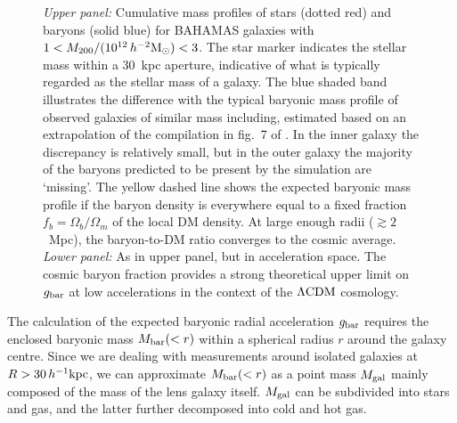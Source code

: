 \documentclass[usenatbib]{mnras}
\newcommand{\hmsun}{\,h^{-2} {\rm M_\odot}}
\newcommand{\hkpc}{\, h^{-1}{\rm{kpc}} }
\newcommand{\lcdm}{{\rm \Lambda CDM}}
\newcommand{\un}[1]{_{\rm #1}}
\begin{document}
\begin{figure}
	\caption{\emph{Upper panel: }Cumulative mass profiles of stars (dotted red) and baryons (solid blue) for BAHAMAS galaxies with $1<M_{200}/(10^{12}\hmsun)<3$. The star marker indicates the stellar mass within a $30$~kpc aperture, indicative of what is typically regarded as the stellar mass of a galaxy. The blue shaded band illustrates the difference with the typical baryonic mass profile of observed galaxies of similar mass including, estimated based on an extrapolation of the compilation in fig.~7 of \citet{tumlinson2017}. In the inner galaxy the discrepancy is relatively small, but in the outer galaxy the majority of the baryons predicted to be present by the simulation are `missing'. The yellow dashed line shows the expected baryonic mass profile if the baryon density is everywhere equal to a fixed fraction $f_b=\Omega_b/\Omega_m$ of the local DM density. At large enough radii ($\gtrsim 2$~Mpc), the baryon-to-DM ratio converges to the cosmic average. \emph{Lower panel: } As in upper panel, but in acceleration space. The cosmic baryon fraction provides a strong theoretical upper limit on $g\un{bar}$ at low accelerations in the context of the $\lcdm$ cosmology.}
	\label{fig:missing-baryons}
\end{figure}

The calculation of the expected baryonic radial acceleration $g\un{bar}$ requires the enclosed baryonic mass $M\un{bar}(<r)$ within a spherical radius $r$ around the galaxy centre. Since we are dealing with measurements around isolated galaxies at $R>30\hkpc$, we can approximate $M\un{bar}(<r)$ as a point mass $M\un{gal}$ mainly composed of the mass of the lens galaxy itself. $M\un{gal}$ can be subdivided into stars and gas, and the latter further decomposed into cold and hot gas.
\end{document}
